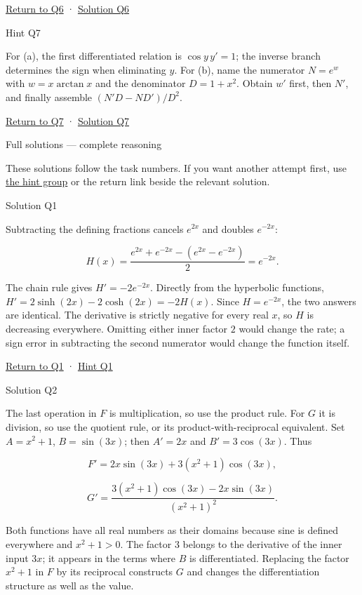 \documentclass[
  11pt,
]{article}
\providecommand{\gt}{>}
\begin{document}
\protect\hyperlink{task-q6}{Return to Q6} ·
\protect\hyperlink{solution-q6}{Solution Q6}

Hint Q7

For (a), the first differentiated relation is \(\cos y\,y'=1\); the
inverse branch determines the sign when eliminating \(y\). For (b), name
the numerator \(N=e^w\) with \(w=x\arctan x\) and the denominator
\(D=1+x^2\). Obtain \(w'\) first, then \(N'\), and finally assemble
\((N'D-ND')/D^2\).

\protect\hyperlink{task-q7}{Return to Q7} ·
\protect\hyperlink{solution-q7}{Solution Q7}

Full solutions --- complete reasoning

These solutions follow the task numbers. If you want another attempt
first, use \protect\hyperlink{hints}{the hint group} or the return link
beside the relevant solution.

Solution Q1

Subtracting the defining fractions cancels \(e^{2x}\) and doubles
\(e^{-2x}\):

\[H(x)=\frac{e^{2x}+e^{-2x}-(e^{2x}-e^{-2x})}{2}=e^{-2x}.\]

The chain rule gives \(H'=-2e^{-2x}\). Directly from the hyperbolic
functions, \(H'=2\sinh(2x)-2\cosh(2x)=-2H(x)\). Since \(H=e^{-2x}\), the
two answers are identical. The derivative is strictly negative for every
real \(x\), so \(H\) is decreasing everywhere. Omitting either inner
factor \(2\) would change the rate; a sign error in subtracting the
second numerator would change the function itself.

\protect\hyperlink{task-q1}{Return to Q1} ·
\protect\hyperlink{hint-q1}{Hint Q1}

Solution Q2

The last operation in \(F\) is multiplication, so use the product rule.
For \(G\) it is division, so use the quotient rule, or its
product-with-reciprocal equivalent. Set \(A=x^2+1\), \(B=\sin(3x)\);
then \(A'=2x\) and \(B'=3\cos(3x)\). Thus

\[F'=2x\sin(3x)+3(x^2+1)\cos(3x),\]

\[G'=\frac{3(x^2+1)\cos(3x)-2x\sin(3x)}{(x^2+1)^2}.\]

Both functions have all real numbers as their domains because sine is
defined everywhere and \(x^2+1\gt 0\). The factor \(3\) belongs to the
derivative of the inner input \(3x\); it appears in the terms where
\(B\) is differentiated. Replacing the factor \(x^2+1\) in \(F\) by its
reciprocal constructs \(G\) and changes the differentiation structure as
well as the value.
\end{document}
